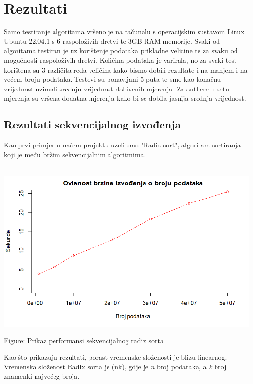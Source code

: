 \documentclass[conference]{IEEEtran}
\begin{document}
\section{Rezultati}
Samo testiranje algoritama vršeno je na računalu s operacijskim sustavom Linux Ubuntu 22.04.1 s 6 raspoloživih dretvi
te 3GB RAM memorije. Svaki od algoritama testiran je uz korištenje podataka prikladne velicine te za svaku od mogućnosti raspoloživih
dretvi. Količina podataka je varirala, no za svaki test korištena su 3 različita reda veličina kako bismo dobili rezultate 
i na manjem i na većem broju podataka. Testovi su ponavljani 5 puta te smo kao konačnu vrijednost uzimali srednju vrijednost dobivenih
mjerenja. Za outliere u setu mjerenja su vršena dodatna mjerenja kako bi se dobila jasnija srednja vrijednost.
\subsection{Rezultati sekvencijalnog izvođenja}\label{AA}
Kao prvi primjer u našem projektu uzeli smo "Radix sort", algoritam sortiranja koji je među bržim sekvencijalnim algoritmima.
\\
\\

\noindent
\begin{minipage}{\linewidth}
\centering
\includegraphics[width=1\linewidth]{radixPerf.png}
\caption{Figure: Prikaz performansi sekvencijalnog radix sorta}
\label{radix - performance}
\end{minipage}

Kao što prikazuju rezultati, porast vremenske složenosti je blizu linearnog. Vremenska složenost Radix sorta je (nk), gdje je \textit{n} broj podataka, a \textit{k} broj znamenki najvećeg broja.
\\
\end{document}
